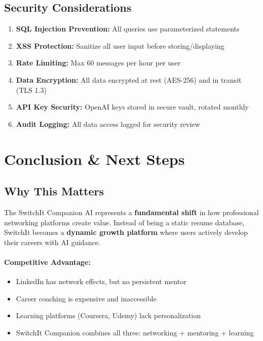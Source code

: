 \documentclass[12pt,a4paper]{article}
\begin{document}
\subsection{Security Considerations}

\begin{enumerate}[leftmargin=*]
    \item \textbf{SQL Injection Prevention:} All queries use parameterized statements
    \item \textbf{XSS Protection:} Sanitize all user input before storing/displaying
    \item \textbf{Rate Limiting:} Max 60 messages per hour per user
    \item \textbf{Data Encryption:} All data encrypted at rest (AES-256) and in transit (TLS 1.3)
    \item \textbf{API Key Security:} OpenAI keys stored in secure vault, rotated monthly
    \item \textbf{Audit Logging:} All data access logged for security review
\end{enumerate}

\section{Conclusion \& Next Steps}

\subsection{Why This Matters}

The SwitchIt Companion AI represents a \textbf{fundamental shift} in how professional networking platforms create value. Instead of being a static resume database, SwitchIt becomes a \textbf{dynamic growth platform} where users actively develop their careers with AI guidance.

\paragraph{Competitive Advantage:}
\begin{itemize}
    \item LinkedIn has network effects, but no persistent mentor
    \item Career coaching is expensive and inaccessible
    \item Learning platforms (Coursera, Udemy) lack personalization
    \item SwitchIt Companion combines all three: networking + mentoring + learning
\end{itemize}
\end{document}
